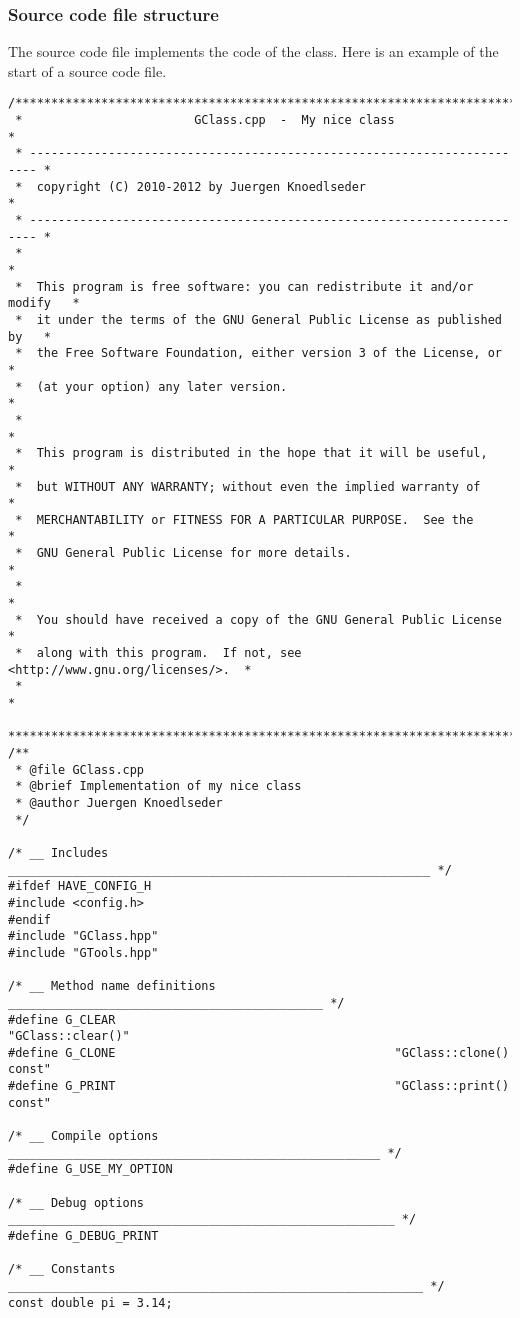 \documentclass{article}[12pt,a4]
\begin{document}
\subsubsection{Source code file structure}
\label{sec:sourcecode}

The source code file implements the code of the class.
Here is an example of the start of a source code file.
\begin{verbatim}
/***************************************************************************
 *                        GClass.cpp  -  My nice class                     *
 * ----------------------------------------------------------------------- *
 *  copyright (C) 2010-2012 by Juergen Knoedlseder                         *
 * ----------------------------------------------------------------------- *
 *                                                                         *
 *  This program is free software: you can redistribute it and/or modify   *
 *  it under the terms of the GNU General Public License as published by   *
 *  the Free Software Foundation, either version 3 of the License, or      *
 *  (at your option) any later version.                                    *
 *                                                                         *
 *  This program is distributed in the hope that it will be useful,        *
 *  but WITHOUT ANY WARRANTY; without even the implied warranty of         *
 *  MERCHANTABILITY or FITNESS FOR A PARTICULAR PURPOSE.  See the          *
 *  GNU General Public License for more details.                           *
 *                                                                         *
 *  You should have received a copy of the GNU General Public License      *
 *  along with this program.  If not, see <http://www.gnu.org/licenses/>.  *
 *                                                                         *
 ***************************************************************************/
/**
 * @file GClass.cpp
 * @brief Implementation of my nice class
 * @author Juergen Knoedlseder
 */

/* __ Includes ___________________________________________________________ */
#ifdef HAVE_CONFIG_H
#include <config.h>
#endif
#include "GClass.hpp"
#include "GTools.hpp"

/* __ Method name definitions ____________________________________________ */
#define G_CLEAR                                             "GClass::clear()"
#define G_CLONE                                       "GClass::clone() const"
#define G_PRINT                                       "GClass::print() const"

/* __ Compile options ____________________________________________________ */
#define G_USE_MY_OPTION

/* __ Debug options ______________________________________________________ */
#define G_DEBUG_PRINT

/* __ Constants __________________________________________________________ */
const double pi = 3.14;
\end{verbatim}
\end{document}
